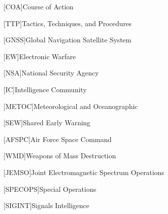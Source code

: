 [COA]{Course of Action}

[TTP]{Tactics, Techniques, and Procedures}

[GNSS]{Global Navigation Satellite System}

[EW]{Electronic Warfare}

[NSA]{National Security Agency}

[IC]{Intelligence Community}

[METOC]{Meteorological and Oceanographic}

[SEW]{Shared Early Warning}

[AFSPC]{Air Force Space Command}

[WMD]{Weapons of Mass Destruction}

[JEMSO]{Joint Electromagnetic Spectrum Operations}

[SPECOPS]{Special Operations}

[SIGINT]{Signals Intelligence}
